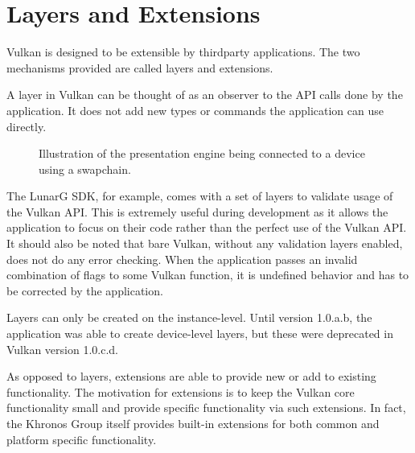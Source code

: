   \section{Layers and Extensions}
  \label{sec:LayersAndExtensions}

    Vulkan is designed to be extensible by thirdparty \glspl{application}. The two mechanisms provided are called layers and extensions.

    A layer in Vulkan can be thought of as an observer to the API calls done by the \gls{application}. It does not add new types or commands the \gls{application} can use directly.

    \begin{figure}
      \caption{Illustration of the presentation engine being connected to a device using a swapchain.}
      \centering
      \label{fig:VulkanLayers}
    \end{figure}

    The LunarG SDK, for example, comes with a set of layers to validate usage of the Vulkan API. This is extremely useful during development as it allows the \gls{application} to focus on their code rather than the perfect use of the Vulkan API. It should also be noted that bare Vulkan, without any validation layers enabled, does not do any error checking. When the \gls{application} passes an invalid combination of flags to some Vulkan function, it is undefined behavior and has to be corrected by the \gls{application}.

    Layers can only be created on the instance-level. Until version 1.0.a.b, the \gls{application} was able to create device-level layers, but these were deprecated in Vulkan version 1.0.c.d.


    As opposed to layers, extensions are able to provide new or add to existing functionality. The motivation for extensions is to keep the Vulkan core functionality small and provide specific functionality via such extensions. In fact, the Khronos Group itself provides built-in extensions for both common and platform specific functionality.

